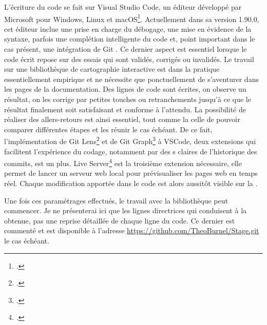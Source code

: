 L’écriture du code se fait sur Visual Studio Code, un éditeur développé par Microsoft pour Windows, Linux et macOS\footcite{noauthor_visual_nodate}. Actuellement dans sa version 1.90.0, cet éditeur inclue une prise en charge du débogage, une mise en évidence de la syntaxe, parfois une complétion intelligente du code et, point important dans le cas présent, une intégration de Git . Ce dernier aspect est essentiel lorsque le code écrit repose sur des essais qui sont validés, corrigés ou invalidés. Le travail sur une bibliothèque de cartographie interactive est dans la pratique essentiellement empirique et ne nécessite que ponctuellement de s’aventurer dans les pages de la documentation. Des lignes de code sont écrites, on observe un résultat, on les corrige par petites touches ou retranchements jusqu’à ce que le résultat finalement soit satisfaisant et conforme à l’attendu. La possibilité de réaliser des allers-retours est ainsi essentiel, tout comme la celle de pouvoir comparer différentes étapes et les réunir le cas échéant. De ce fait, l’implémentation de Git Lens\footcite{noauthor_gitlens_nodate} et de Git Graph\footcite{noauthor_git_nodate} à VSCode, deux extensions qui facilitent l’expérience du codage, notamment par des s claires de l’historique des commits, est un plus. Live Server\footcite{noauthor_live_nodate} est la troisième extension nécessaire, elle permet de lancer un serveur web local pour prévisualiser les pages web en temps réel. Chaque modification apportée dans le code est alors aussitôt visible sur la .\\\par
Une fois ces paramétrages effectués, le travail avec la bibliothèque  peut commencer. Je ne présenterai ici que les lignes directrices qui conduisent à la  obtenue, pas une reprise détaillée de chaque ligne du code. Ce dernier est commenté et est disponible à l’adresse \url{https://github.com/TheoBurnel/Stage.git} le cas échéant.\par
